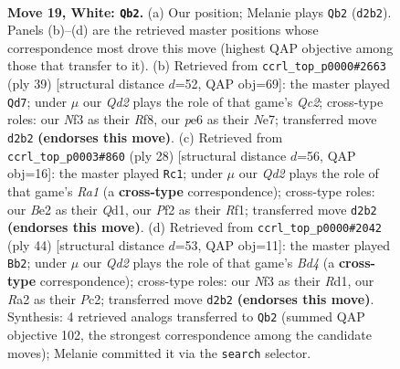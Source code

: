 \documentclass[11pt]{article}
\begin{document}
\clearpage

\begin{figure}[p]\centering
\begin{subfigure}{0.46\textwidth}\centering
\resizebox{\linewidth}{!}{%
\newchessgame
\chessboard[
  setfen={r2r2k1/1p1bqppp/2n1p3/p1Pp4/3P4/P1P2N1P/R2QBPP1/2R3K1 w - - 4 19},
  showmover=false,
  pgfstyle=straightmove, color=movearrow, markmove={d2-b2}
]}
\caption{}
\end{subfigure}\hfill
\begin{subfigure}{0.46\textwidth}\centering
\resizebox{\linewidth}{!}{%
\newchessgame
\chessboard[
  setfen={5rk1/1pq1np2/p2r1bpp/3p4/P1pP1PP1/2N1P3/1P2Q1BP/R4R1K b - - 0 20},
  showmover=false,
  pgfstyle=straightmove, color=movearrow, markmove={c7-d7}
]}
\caption{}
\end{subfigure}
\\[4pt]
\begin{subfigure}{0.46\textwidth}\centering
\resizebox{\linewidth}{!}{%
\newchessgame
\chessboard[
  setfen={r2q1rk1/1b1n1pp1/1p5p/p1pp4/3P4/1P1BPN2/P4PPP/R2Q1RK1 w - - 0 15},
  showmover=false,
  pgfstyle=straightmove, color=movearrow, markmove={a1-c1}
]}
\caption{}
\end{subfigure}\hfill
\begin{subfigure}{0.46\textwidth}\centering
\resizebox{\linewidth}{!}{%
\newchessgame
\chessboard[
  setfen={2rr2k1/1q3pb1/p2pp2p/1p2n2p/3BP3/1P2NP2/P1PQ1RP1/1K1R4 w - - 0 23},
  showmover=false,
  pgfstyle=straightmove, color=movearrow, markmove={d4-b2}
]}
\caption{}
\end{subfigure}
\caption{\textbf{Move 19, White: \texttt{Qb2}.} (a) Our position; Melanie plays \texttt{Qb2} (\texttt{d2b2}). Panels (b)--(d) are the retrieved master positions whose correspondence most drove this move (highest QAP objective among those that transfer to it). (b) Retrieved from \texttt{ccrl\_top\_p0000\#2663} (ply 39) [structural distance $d$=52, QAP obj=69]: the master played \texttt{Qd7}; under $\mu$ our \emph{Qd2} plays the role of that game's \emph{Qc2}; cross-type roles: our \emph{N}f3 as their \emph{R}f8, our \emph{p}e6 as their \emph{N}e7; transferred move \texttt{d2b2} \textbf{(endorses this move)}. (c) Retrieved from \texttt{ccrl\_top\_p0003\#860} (ply 28) [structural distance $d$=56, QAP obj=16]: the master played \texttt{Rc1}; under $\mu$ our \emph{Qd2} plays the role of that game's \emph{Ra1} (a \textbf{cross-type} correspondence); cross-type roles: our \emph{B}e2 as their \emph{Q}d1, our \emph{P}f2 as their \emph{R}f1; transferred move \texttt{d2b2} \textbf{(endorses this move)}. (d) Retrieved from \texttt{ccrl\_top\_p0000\#2042} (ply 44) [structural distance $d$=53, QAP obj=11]: the master played \texttt{Bb2}; under $\mu$ our \emph{Qd2} plays the role of that game's \emph{Bd4} (a \textbf{cross-type} correspondence); cross-type roles: our \emph{N}f3 as their \emph{R}d1, our \emph{R}a2 as their \emph{P}c2; transferred move \texttt{d2b2} \textbf{(endorses this move)}. Synthesis: 4 retrieved analogs transferred to \texttt{Qb2} (summed QAP objective 102, the strongest correspondence among the candidate moves); Melanie committed it via the \texttt{search} selector.}
\label{fig:thought-m36}
\end{figure}
\end{document}
